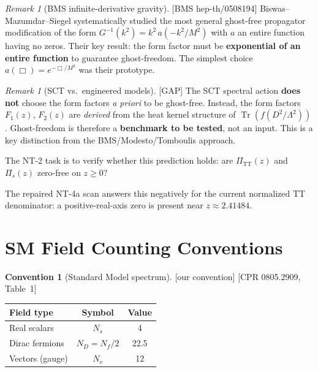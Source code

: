 \documentclass[12pt,a4paper]{article}
\theoremstyle{definition}
\newtheorem{convention}[proposition]{Convention}
\theoremstyle{remark}
\newtheorem{remark}[proposition]{Remark}
\newcommand{\Tr}{\operatorname{Tr}}
\newcommand{\fromlit}[1]{\textcolor{blue!70!black}{\textsf{[#1]}}}
\newcommand{\oursign}{\textcolor{teal!80!black}{\textsf{[our convention]}}}
\newcommand{\gap}{\textcolor{red!80!black}{\textsf{[GAP]}}}
\begin{document}
\begin{remark}[BMS infinite-derivative gravity]
\fromlit{BMS hep-th/0508194}
Biswas--Mazumdar--Siegel systematically studied the most general
ghost-free propagator modification of the form
$G^{-1}(k^2) = k^2\,a(-k^2/M^2)$ with $a$ an entire function
having no zeros.  Their key result: the form factor must be
\textbf{exponential of an entire function} to guarantee ghost-freedom.
The simplest choice $a(\Box) = e^{-\Box/M^2}$ was their prototype.
\end{remark}

\begin{remark}[SCT vs.\ engineered models]
\gap\;
The SCT spectral action \textbf{does not} choose the form factors
\emph{a priori} to be ghost-free.  Instead, the form factors
$F_1(z)$, $F_2(z)$ are \emph{derived} from the heat kernel
structure of $\Tr(f(D^2/\Lambda^2))$.  Ghost-freedom is therefore a
\textbf{benchmark to be tested}, not an input.  This is a key
distinction from the BMS/Modesto/Tomboulis approach.

\medskip
The NT-2 task is to verify whether this prediction holds:
are $\Pi_{\text{TT}}(z)$ and $\Pi_s(z)$ zero-free on $z \geq 0$?
\par\smallskip
The repaired NT-4a scan answers this negatively for the current
normalized TT denominator: a positive-real-axis zero is present near
$z \approx 2.41484$.
\end{remark}


\section{SM Field Counting Conventions}
\label{sec:sm-counting}

\begin{convention}[Standard Model spectrum]
\label{conv:sm-spectrum}
\oursign\;
\fromlit{CPR 0805.2909, Table~1}
\begin{center}
\begin{tabular}{lcc}
\toprule
Field type & Symbol & Value \\
\midrule
Real scalars & $N_s$ & 4 \\
Dirac fermions & $N_D = N_f/2$ & 22.5 \\
Vectors (gauge) & $N_v$ & 12 \\
\bottomrule
\end{tabular}
\end{center}
\end{convention}
\end{document}
